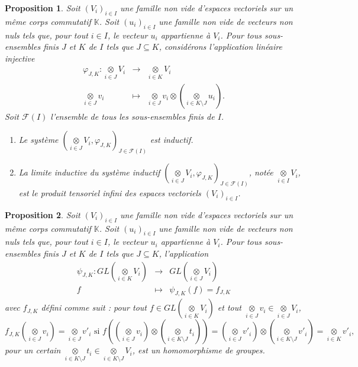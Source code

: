 \documentclass[9pt]{beamer}
\newtheorem{proposition}{Proposition}
\begin{document}
\begin{frame}

\begin{proposition}
Soit $(V_i)_{i\in I}$ une famille non vide d’espaces vectoriels sur un même corps commutatif  $\mathbb{K}$. Soit $(u_i)_{i\in I}$ une famille non vide de vecteurs non nuls tels que, pour tout $i\in I$, le vecteur $u_i$ appartienne à $V_i$. Pour tous sous-ensembles finis $J$ et $K$ de $I$ tels que $J\subseteq K$, considérons l'application linéaire injective  
	$$\begin{array}{rlll}
		\varphi_{J,K}: \underset{i\in J}\otimes V_i& \longrightarrow& \underset{i\in K}\otimes V_i\\
		\underset{i\in J}\otimes v_i&\longmapsto& \underset{i\in J}\otimes v_i\otimes(\underset{i\in K\setminus J}\otimes u_i).
	\end{array}
	$$
	Soit $\mathcal{F}(I)$ l'ensemble de tous les sous-ensembles finis de $I$. 
	\begin{enumerate}[label=\roman*)]
		\item Le système $(\underset{i\in J}\otimes V_i, \varphi_{J,K})_{J\in \mathcal{F}(I)}$ est inductif.
		\item La limite inductive du système inductif $(\underset{i\in J}\otimes V_i, \varphi_{J,K})_{J\in \mathcal{F}(I)}$, notée $\underset{i\in I}\otimes V_i$, est le produit tensoriel infini des espaces vectoriels $(V_i)_{i\in I}$.
	\end{enumerate}
\end{proposition}
\end{frame}


\begin{frame}
\begin{proposition}\label{prop1}
Soit $(V_i)_{i\in I}$ une famille non vide d’espaces vectoriels sur un même corps commutatif  $\mathbb{K}$. Soit $(u_i)_{i\in I}$ une famille non vide de vecteurs non nuls tels que, pour tout $i\in I$, le vecteur $u_i$ appartienne à $V_i$. Pour tous sous-ensembles finis $J$ et $K$ de $I$ tels que $J\subseteq K$, l’application  
	$$\begin{array}{rlll}
		\psi_{J,K}: GL(\underset{i\in K}\otimes V_i)& \longrightarrow& GL(\underset{i\in J}\otimes V_i)\\
		f&\longmapsto& \psi_{J,K} (f)= f_{J,K}
	\end{array}
	$$ 
	avec $f_{J,K}$ défini comme suit : pour tout $f\in GL(\underset{i\in K}\otimes V_i)$ et tout $\underset{i\in J}\otimes v_i\in \underset{i\in J}\otimes V_i$,  
	$$f_{J,K}(\underset{i\in J}\otimes v_i)= \underset{i\in J}\otimes v'_i \text{ si } f((\underset{i\in J}\otimes v_i)\otimes (\underset{i\in K\setminus J}\otimes t_i))= (\underset{i\in J}\otimes v'_i)\otimes (\underset{i\in K\setminus J}\otimes v'_i)= \underset{i\in K}\otimes v'_i,$$  
	pour un certain $\underset{i\in K\setminus J}\otimes t_i\in \underset{i\in K\setminus J}\otimes V_i$, est un homomorphisme de groupes.
\end{proposition}
\end{frame}
\end{document}
